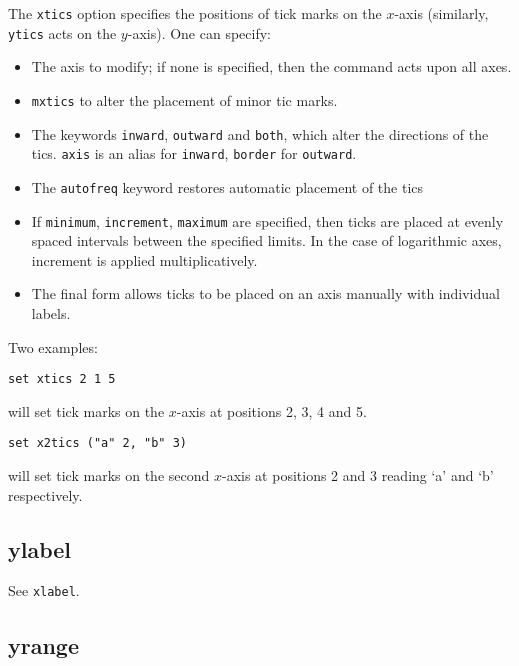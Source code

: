 The {\tt xtics} option specifies the positions of tick marks on the $x$-axis
(similarly, {\tt ytics} acts on the $y$-axis).  One can specify:

\begin{itemize}
\item The axis to modify; if none is specified, then the command acts upon all axes.

\item {\tt mxtics} to alter the placement of minor tic marks.

\item The keywords {\tt inward}, {\tt outward} and {\tt both}, which alter the
directions of the tics.  {\tt axis} is an alias for {\tt inward}, {\tt border}
for {\tt outward}.

\item The {\tt autofreq} keyword restores automatic placement of the tics

\item If {\tt minimum}, {\tt increment}, {\tt maximum} are specified, then ticks
are placed at evenly spaced intervals between the specified limits. In the case
of logarithmic axes, increment is applied multiplicatively. 

\item The final form allows ticks to be placed on an axis manually with
individual labels.
\end{itemize}
   
Two examples:

\begin{verbatim}
set xtics 2 1 5
\end{verbatim}

\noindent will set tick marks on the $x$-axis at positions 2, 3, 4 and 5.

\begin{verbatim}
set x2tics ("a" 2, "b" 3)
\end{verbatim}

\noindent will set tick marks on the second $x$-axis at positions 2 and 3 reading `a' and
`b' respectively.


\subsection{ylabel}

See {\tt xlabel}.


\subsection{yrange}

